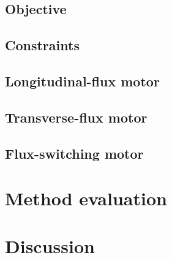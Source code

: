        \subsection{Objective}                  \label{Chapter:PMLSM design RSM/design optimization/method outline/objectives}
        \subsection{Constraints}                \label{Chapter:PMLSM design RSM/design optimization/method outline/constraints}
    \subsection{Longitudinal-flux motor}        \label{Chapter:PMLSM design RSM/design optimization/longitudinal flux}
    \subsection{Transverse-flux motor}          \label{Chapter:PMLSM design RSM/design optimization/transverse flux}
    \subsection{Flux-switching motor}           \label{Chapter:PMLSM design RSM/design optimization/flux switching}


\section{Method evaluation}                     \label{Chapter:PMLSM design RSM/method evaluation}


\section{Discussion}                            \label{Chapter:PMLSM design RSM/discussion}